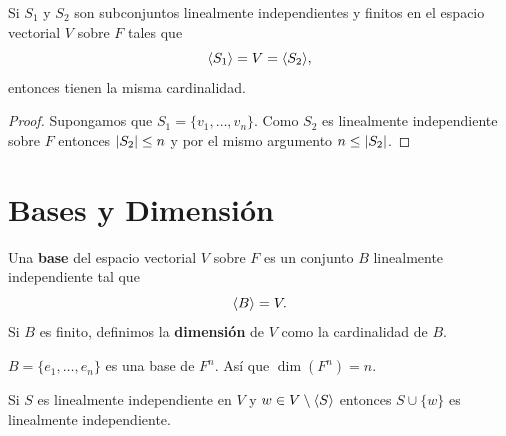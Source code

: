 \documentclass[12pt,a4paper]{book}
\begin{document}
    \begin{corolario}
    \label{coro:4}
        Si $S_{1}$ y $S_{2}$ son subconjuntos linealmente independientes y finitos en el espacio
        vectorial $V$ sobre $F$ tales que
        \begin{equation*}
            \langle S_{1} \rangle=V=\langle S_{2} \rangle,
        \end{equation*}
        entonces tienen la misma cardinalidad.
    \end{corolario}

    \begin{proof}
        Supongamos que $S_{1}=\{v_{1},\dots,v_{n}\}$. Como $S_{2}$ es linealmente independiente
        sobre $F$ entonces $\abs{S_{2}}\leq n$ y por el mismo argumento $n\leq\abs{S_{2}}$.
    \end{proof}

    \section{Bases y Dimensión}

    \begin{definicion}
    \label{def:16}
        Una \textbf{base} del espacio vectorial $V$ sobre $F$ es un conjunto $B$ linealmente independiente
        tal que
        \begin{equation*}
            \langle B \rangle=V.
        \end{equation*}
        Si $B$ es finito, definimos la \textbf{dimensión} de $V$ como la cardinalidad de
        $B$.
    \end{definicion}

    \begin{ejemplo}
    \label{ej:18}
        $B=\{e_{1},\dots,e_{n}\}$ es una base de $F^{n}$. Así que $\dim(F^{n})=n$.
    \end{ejemplo}

    \begin{lema}
    \label{lema:3}
        Si $S$ es linealmente independiente en $V$ y $w\in V\setminus\langle S \rangle$ entonces
        $S\cup\{w\}$ es linealmente independiente.
    \end{lema}
\end{document}
